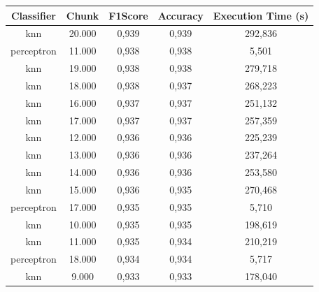 \documentclass[12pt]{article}
\begin{document}
\begin{table}[!htb]
  \centering
\begin{tabular}{|c|c|c|c|c|}
\hline
\textbf{Classifier} & \textbf{Chunk} & \textbf{F1Score} & \textbf{Accuracy} & \textbf{Execution Time (s)} \\ \hline
knn                 & 20.000         & 0,939            & 0,939             & 292,836                     \\ \hline
perceptron          & 11.000         & 0,938            & 0,938             & 5,501                       \\ \hline
knn                 & 19.000         & 0,938            & 0,938             & 279,718                     \\ \hline
knn                 & 18.000         & 0,938            & 0,937             & 268,223                     \\ \hline
knn                 & 16.000         & 0,937            & 0,937             & 251,132                     \\ \hline
knn                 & 17.000         & 0,937            & 0,937             & 257,359                     \\ \hline
knn                 & 12.000         & 0,936            & 0,936             & 225,239                     \\ \hline
knn                 & 13.000         & 0,936            & 0,936             & 237,264                     \\ \hline
knn                 & 14.000         & 0,936            & 0,936             & 253,580                     \\ \hline
knn                 & 15.000         & 0,936            & 0,935             & 270,468                     \\ \hline
perceptron          & 17.000         & 0,935            & 0,935             & 5,710                       \\ \hline
knn                 & 10.000         & 0,935            & 0,935             & 198,619                     \\ \hline
knn                 & 11.000         & 0,935            & 0,934             & 210,219                     \\ \hline
perceptron          & 18.000         & 0,934            & 0,934             & 5,717                       \\ \hline
knn                 & 9.000          & 0,933            & 0,933             & 178,040                     \\ \hline

\end{tabular}
\end{table}
\end{document}
